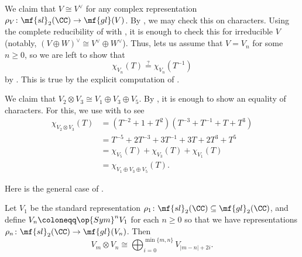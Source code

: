 \documentclass[../notes.tex]{subfiles}
\begin{document}
\begin{example} \label{ex:sl2-dual-reps}
	We claim that $V\cong V^\lor$ for any complex representation $\rho_V\colon\mf{sl}_2(\CC)\to\mf{gl}(V)$. By , we may check this on characters. Using the complete reducibility of  with , it is enough to check this for irreducible $V$ (notably, $(V\oplus W)^\lor\cong V^\lor\oplus W^\lor$). Thus,  lets us assume that $V=V_n$ for some $n\ge0$, so we are left to show that
	\[\chi_{V_n}(T)\stackrel?=\chi_{V_n}\left(T^{-1}\right)\]
	by . This is true by the explicit computation of .
\end{example}
\begin{example} \label{ex:sl2-tensor-example}
	We claim that $V_2\otimes V_3\cong V_1\oplus V_3\oplus V_5$. By , it is enough to show an equality of characters. For this, we use  with  to see
	\begin{align*}
		\chi_{V_2\otimes V_3}(T) &= \left(T^{-2}+1+T^2\right)\left(T^{-3}+T^{-1}+T+T^3\right) \\
		&= T^{-5}+2T^{-3}+3T^{-1}+3T+2T^3+T^5 \\
		&= \chi_{V_5}(T)+\chi_{V_3}(T)+\chi_{V_1}(T) \\
		&= \chi_{V_1\oplus V_3\oplus V_5}(T).
	\end{align*}
\end{example}
Here is the general case of .
\begin{proposition}
	Let $V_1$ be the standard representation $\rho_1\colon\mf{sl}_2(\CC)\subseteq\mf{gl}_2(\CC)$, and define $V_n\coloneqq\op{Sym}^nV_1$ for each $n\ge0$ so that we have representations $\rho_n\colon\mf{sl}_2(\CC)\to\mf{gl}(V_n)$. Then
	\[V_m\otimes V_n\cong\bigoplus_{i=0}^{\min\{m,n\}}V_{\left|m-n\right|+2i}.\]
\end{proposition}
\end{document}
